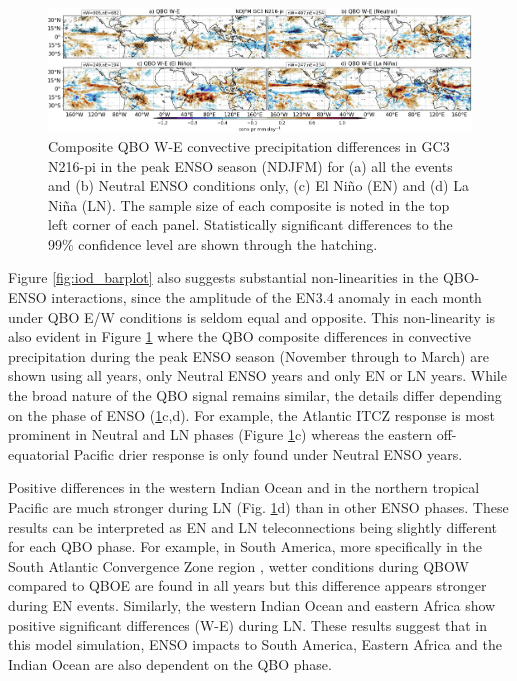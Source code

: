   \begin{figure}[t!]
\centering
 \includegraphics[width=1.02\linewidth]{figures/ensoqboconv_prwinter.png}
\caption[Precipitation response to QBO W-E for GC3 N216-pi under different QBO phases.]{  Composite QBO W-E convective precipitation differences in GC3 N216-pi in the peak ENSO season (NDJFM) for (a) all the events and (b) Neutral ENSO conditions only, (c) El Niño  (EN) and (d) La Niña (LN). The sample size of each composite is noted in the top left corner of each panel. Statistically significant differences to the 99\% confidence level are shown through the hatching. }
\label{fig:qboenso}
\end{figure}

Figure \ref{fig:iod_barplot} also suggests substantial non-linearities in the QBO-ENSO interactions, since the amplitude of the EN3.4 anomaly in each month under QBO E/W conditions is seldom equal and opposite. This non-linearity is also evident in Figure \ref{fig:qboenso} where the QBO composite differences in convective precipitation during the peak ENSO season (November through to March) are shown using all years, only Neutral ENSO years and only EN or LN years. While the broad nature of the QBO signal remains similar, the details differ depending on the phase of ENSO (\ref{fig:qboenso}c,d). For example, the Atlantic ITCZ response is most prominent in Neutral and LN phases (Figure \ref{fig:qboenso}c) whereas the eastern off-equatorial Pacific drier response is only found under Neutral ENSO years. %

Positive differences in the western Indian Ocean and in the northern tropical Pacific are much stronger during LN (Fig. \ref{fig:qboenso}d) than in other ENSO phases. These results can be interpreted as EN and LN teleconnections being slightly different for each QBO phase. For example, in South America, more specifically in the South Atlantic Convergence Zone region \citep{jorgetti2014,zilli2019}, wetter conditions during QBOW compared to QBOE are found in all years but this difference appears stronger during EN events. Similarly, the western Indian Ocean and eastern Africa show positive significant differences (W-E) during LN. These results suggest that in this model simulation, ENSO impacts to South America, Eastern Africa and the Indian Ocean are also dependent on the QBO phase. %

